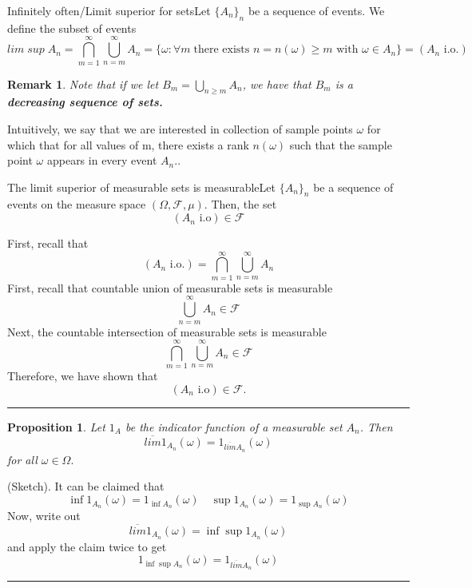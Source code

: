 \documentclass[twoside]{article}
\newtheorem{proposition}[theorem]{Proposition}
\newtheorem{remark}[theorem]{Remark}
\newenvironment{proof}{{\bf Proof:}}{\hfill\rule{2mm}{2mm}}
\newcommand{\sigmalgebra}{\mathcal{F}}
\begin{document}
\begin{definition_exam}{Infinitely often/Limit superior for sets}{}Let $\{A_n\}_n$ be a sequence of events. We define the subset of events
$$
lim\;sup\;A_n = \bigcap_{m=1}^{\infty}\bigcup_{n = m}^{\infty}A_n = \{\omega: \forall m \; \text{there exists }n=n(\omega) \geq m \text{ with } \omega \in A_n\} = (A_n \text{ i.o.})
$$
\end{definition_exam}
\begin{remark}Note that if we let $B_m = \bigcup_{n \geq m}A_n$, we have that $B_m$ is a \textbf{decreasing sequence of sets.} 
\end{remark}

Intuitively, we say that we are interested in collection of sample points $\omega$ for which that for all values of m, there exists a rank $n(\omega)$ such that the sample point $\omega$ appears in every event $A_n.$. 

\begin{proposition_exam}{The limit superior of measurable sets is measurable}{}Let $\{A_n\}_n$ be a sequence of events on the measure space $(\Omega, \sigmalgebra, \mu).$ Then, the set $$(A_n \text{ i.o}) \in \sigmalgebra$$ 
\end{proposition_exam}

\begin{proof} First, recall that 
$$
(A_n \text{ i.o.}) = \bigcap_{m=1}^{\infty}\bigcup_{n = m}^{\infty}A_n
$$
First, recall that countable union of measurable sets is measurable
$$
\bigcup_{n = m}^{\infty}A_n \in \sigmalgebra
$$
Next, the countable intersection of measurable sets is measurable
$$
\bigcap_{m=1}^{\infty}\bigcup_{n = m}^{\infty}A_n \in \sigmalgebra
$$
Therefore, we have shown that $$(A_n \text{ i.o}) \in \sigmalgebra.$$ 
\end{proof}




\begin{proposition}Let $1_{A}$ be the indicator function of a measurable set $A_n$. Then 
$$
\overline{lim}1_{A_{n}}(\omega) = 1_{\overline{lim}A_n}(\omega)
$$
for all $\omega \in \Omega.$
\end{proposition}

\begin{proof}(Sketch). It can be claimed that
$$
\inf 1_{A_n}(\omega) = 1_{\inf A_n}(\omega) \quad \sup 1_{A_n}(\omega) = 1_{\sup A_n}(\omega)
$$
Now, write out 
$$
\overline{lim}1_{A_{n}}(\omega) = \inf \sup 1_{A_{n}}(\omega)
$$
and apply the claim twice to get 
$$
1_{\inf \sup A_{n}}(\omega) = 1_{\overline{lim}A_n}(\omega)
$$
\end{proof}
\end{document}
